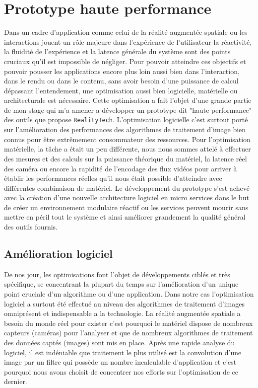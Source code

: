\chapter{Prototype haute performance}
\label{chap:protoHP}

Dans un cadre d'application comme celui de la réalité augmentée spatiale ou les interactions jouent un rôle majeure dans l'expérience de l'utilisateur la réactivité, la fluidité de l'expérience et la latence générale du système sont des points cruciaux qu'il est impossible de négliger. Pour pouvoir atteindre ces objectifs et pouvoir pousser les applications encore plus loin aussi bien dans l'interaction, dans le rendu ou dans le contenu, sans avoir besoin d'une puissance de calcul dépassant l'entendement, une optimisation aussi bien logicielle, matérielle ou architecturale est nécessaire. Cette optimisation a fait l'objet d'une grande partie de mon stage qui m'a amener a développer un prototype dit "haute performance" des outils que propose \texttt{RealityTech}. L'optimisation logicielle c'est surtout porté sur l'amélioration des performances des algorithmes de traitement d'image bien connus pour être extrêmement consommateur des ressources. Pour l'optimisation matérielle, la tâche a était un peu différente, nous nous sommes attelé à effectuer des mesures et des calculs sur la puissance théorique du matériel, la latence réel des caméra ou encore la rapidité de l'encodage des flux vidéos pour arriver à établir les performances réelles qu'il nous était possible d'atteindre avec différentes combinaison de matériel. Le développement du prototype s'est achevé avec la création d'une nouvelle architecture logiciel en micro services dans le but de créer un environnement modulaire réactif ou les services peuvent mourir sans mettre en péril tout le système et ainsi améliorer grandement la qualité général des outils fournis.

\section{Amélioration logiciel}
De nos jour, les optimisations font l'objet de développements ciblés et très spécifique, se concentrant la plupart du temps sur l'amélioration d'un unique point cruciale d'un algorithme ou d'une application. Dans notre cas l'optimisation logiciel a surtout été effectué au niveau des algorithmes de traitement d'images omniprésent et indispensable a la technologie. La réalité augmentée spatiale a besoin du monde réel pour exister c'est pourquoi le matériel dispose de nombreux capteurs (caméras) pour l'analyser et que de nombreux algorithmes de traitement des données captés (images) sont mis en place. Après une rapide analyse du logiciel, il est indéniable que traitement le plus utilisé est la convolution d'une image par un filtre qui possède un nombre incalculable d'application et c'est pourquoi nous avons choisit de concentrer nos efforts sur l'optimisation de ce dernier.

